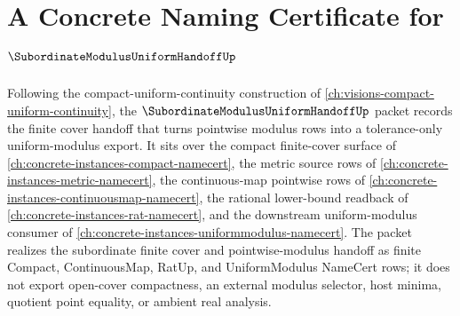 \chapter{A Concrete Naming Certificate for $\SubordinateModulusUniformHandoffUp$}
\label{ch:concrete-instances-subordinate-modulus-uniform-handoff-namecert}

Following the compact-uniform-continuity construction of \autoref{ch:visions-compact-uniform-continuity}, the $\SubordinateModulusUniformHandoffUp$ packet records the finite cover handoff that turns pointwise modulus rows into a tolerance-only uniform-modulus export. It sits over the compact finite-cover surface of \autoref{ch:concrete-instances-compact-namecert}, the metric source rows of \autoref{ch:concrete-instances-metric-namecert}, the continuous-map pointwise rows of \autoref{ch:concrete-instances-continuousmap-namecert}, the rational lower-bound readback of \autoref{ch:concrete-instances-rat-namecert}, and the downstream uniform-modulus consumer of \autoref{ch:concrete-instances-uniformmodulus-namecert}. The packet realizes the subordinate finite cover and pointwise-modulus handoff as finite Compact, ContinuousMap, RatUp, and UniformModulus NameCert rows; it does not export open-cover compactness, an external modulus selector, host minima, quotient point equality, or ambient real analysis.

